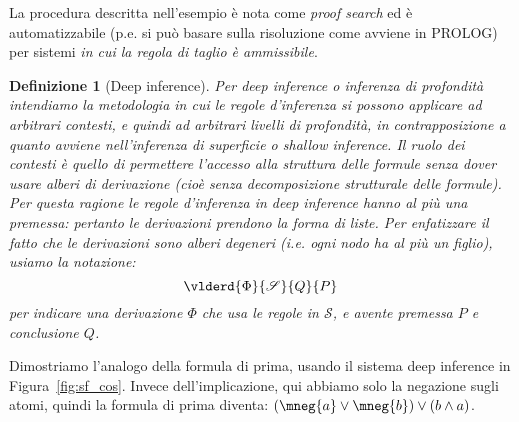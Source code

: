 \documentclass[12pt,a4paper,openright,twoside]{report}
\newtheorem{dfn}[thm]{Definizione}
\begin{document}
La procedura descritta nell'esempio \`e nota come \emph{proof search} ed \`e automatizzabile (p.e. si pu\`o basare sulla risoluzione come avviene in \textsf{PROLOG}) per sistemi \emph{in cui la regola di taglio \`e ammissibile}.

\begin{dfn}[Deep inference] Per \emph{deep inference} o \emph{inferenza di profondit\`a} intendiamo la metodologia in cui le regole d'inferenza si possono applicare ad arbitrari contesti, e quindi ad arbitrari livelli di profondit\`a, in contrapposizione a quanto avviene nell'inferenza di superficie o \emph{shallow inference}. Il ruolo dei contesti \`e quello di permettere l'accesso alla struttura delle formule senza dover usare alberi di derivazione (cio\`e senza decomposizione strutturale delle formule). Per questa ragione le regole d'inferenza in deep inference hanno al pi\`u una premessa: pertanto le derivazioni prendono la forma di liste. Per enfatizzare il fatto che le derivazioni sono \emph{alberi degeneri} (i.e. ogni nodo ha al pi\`u un figlio), usiamo la notazione: 
$$
	\vlderd{\Phi}{\mathscr{S}}{Q}{P}
$$
per indicare una derivazione $\Phi$ che usa le regole in $\mathscr{S}$, e avente premessa $P$ e conclusione $Q$.
\end{dfn}

Dimostriamo l'analogo della formula di prima, usando il sistema deep inference in Figura~\ref{fig:sf_cos}. Invece dell'implicazione, qui abbiamo solo la negazione sugli atomi, quindi la formula di prima diventa: $(\mneg{a} \vee \mneg{b}) \vee (b \wedge a)$.
\end{document}
